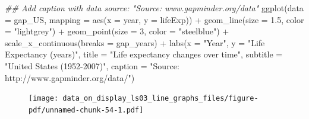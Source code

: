\documentclass[
  letterpaper,
  DIV=11,
  numbers=noendperiod]{scrreprt}
\newenvironment{Shaded}{\begin{snugshade}}{\end{snugshade}}
\newcommand{\AttributeTok}[1]{\textcolor[rgb]{0.40,0.45,0.13}{#1}}
\newcommand{\DecValTok}[1]{\textcolor[rgb]{0.68,0.00,0.00}{#1}}
\newcommand{\DocumentationTok}[1]{\textcolor[rgb]{0.37,0.37,0.37}{\textit{#1}}}
\newcommand{\FloatTok}[1]{\textcolor[rgb]{0.68,0.00,0.00}{#1}}
\newcommand{\FunctionTok}[1]{\textcolor[rgb]{0.28,0.35,0.67}{#1}}
\newcommand{\NormalTok}[1]{\textcolor[rgb]{0.00,0.23,0.31}{#1}}
\newcommand{\SpecialCharTok}[1]{\textcolor[rgb]{0.37,0.37,0.37}{#1}}
\newcommand{\StringTok}[1]{\textcolor[rgb]{0.13,0.47,0.30}{#1}}
\begin{document}
\begin{Shaded}
\begin{Highlighting}[]
\DocumentationTok{\#\# Add caption with data source: "Source: www.gapminder.org/data"}
\FunctionTok{ggplot}\NormalTok{(}\AttributeTok{data =}\NormalTok{ gap\_US, }
       \AttributeTok{mapping =} \FunctionTok{aes}\NormalTok{(}\AttributeTok{x =}\NormalTok{ year, }
                     \AttributeTok{y =}\NormalTok{ lifeExp)) }\SpecialCharTok{+}
  \FunctionTok{geom\_line}\NormalTok{(}\AttributeTok{size =} \FloatTok{1.5}\NormalTok{, }
            \AttributeTok{color =} \StringTok{"lightgrey"}\NormalTok{) }\SpecialCharTok{+}
  \FunctionTok{geom\_point}\NormalTok{(}\AttributeTok{size =} \DecValTok{3}\NormalTok{, }
             \AttributeTok{color =} \StringTok{"steelblue"}\NormalTok{) }\SpecialCharTok{+}
  \FunctionTok{scale\_x\_continuous}\NormalTok{(}\AttributeTok{breaks =}\NormalTok{ gap\_years) }\SpecialCharTok{+}
  \FunctionTok{labs}\NormalTok{(}\AttributeTok{x =} \StringTok{"Year"}\NormalTok{,}
       \AttributeTok{y =} \StringTok{"Life Expectancy (years)"}\NormalTok{,}
       \AttributeTok{title =} \StringTok{"Life expectancy changes over time"}\NormalTok{,}
       \AttributeTok{subtitle =} \StringTok{"United States (1952{-}2007)"}\NormalTok{, }
       \AttributeTok{caption =} \StringTok{"Source: http://www.gapminder.org/data/"}\NormalTok{)}
\end{Highlighting}
\end{Shaded}

\begin{figure}[H]

{\centering \texttt{[image: data\_on\_display\_ls03\_line\_graphs\_files/figure-pdf/unnamed-chunk-54-1.pdf]}

}

\end{figure}
\end{document}
